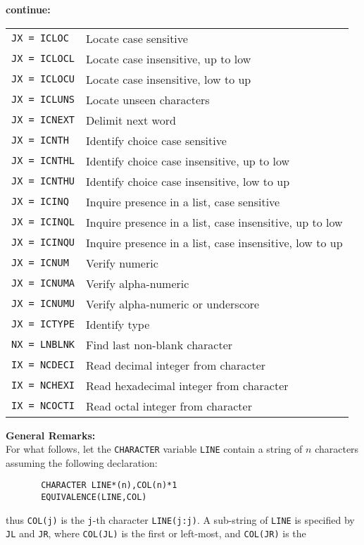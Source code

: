 \newpage
{\bf continue:}
\begin{tabular}[t]{l@{\qquad}l}
{\tt JX = ICLOC}   & Locate case sensitive\\
{\tt JX = ICLOCL}  & Locate case insensitive, up to low\\
{\tt JX = ICLOCU}  & Locate case insensitive, low to up\\
{\tt JX = ICLUNS}  & Locate unseen characters\\
{\tt JX = ICNEXT}  & Delimit next word\\
{\tt JX = ICNTH}   & Identify choice case sensitive\\
{\tt JX = ICNTHL}  & Identify choice case insensitive, up to low\\
{\tt JX = ICNTHU}  & Identify choice case insensitive, low to up\\
{\tt JX = ICINQ}   & Inquire presence in a list, case sensitive\\
{\tt JX = ICINQL}  & Inquire presence in a list, case insensitive,
                     up to low\\
{\tt JX = ICINQU}  & Inquire presence in a list, case insensitive,
                     low to up\\
{\tt JX = ICNUM}   & Verify numeric\\
{\tt JX = ICNUMA}  & Verify alpha-numeric\\
{\tt JX = ICNUMU}  & Verify alpha-numeric or underscore\\
{\tt JX = ICTYPE}  & Identify type\\
{\tt NX = LNBLNK}  & Find last non-blank character\\
{\tt IX = NCDECI}  & Read decimal integer from character\\
{\tt IX = NCHEXI}  & Read hexadecimal integer from character\\
{\tt IX = NCOCTI}  & Read octal integer from character\\
\end{tabular}
\Usage
{\bf General Remarks:} \\[2mm]
For what follows, let the {\tt CHARACTER} variable {\tt LINE} contain a
string of $n$ characters assuming the following declaration:
\begin{verbatim}
       CHARACTER LINE*(n),COL(n)*1
       EQUIVALENCE(LINE,COL)
\end{verbatim}
thus {\tt COL(j)}  is the {\tt j}-th character {\tt LINE(j:j)}.
A sub-string of {\tt LINE} is specified by {\tt JL} and {\tt JR},
where {\tt COL(JL)} is the first or left-most, and {\tt COL(JR)} is the
